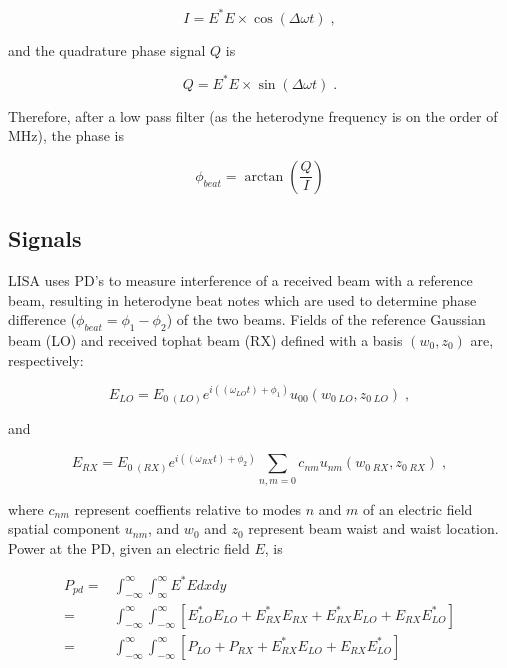 \documentclass[aps,twoside,secnumarabic,balancelastpage,amsmath,amssymb,nofootinbib,hyperref=pdftex]{revtex4}
\begin{document}
\begin{equation}
	I
	=
	E^{*}E \times \cos (\Delta \omega t) \; ,	
\end{equation}

and the quadrature phase signal $Q$ is

\begin{equation}
	Q
	=
	E^{*}E \times \sin (\Delta \omega t) \; .
\end{equation}


Therefore, after a low pass filter (as the heterodyne frequency is on the order of MHz), the phase is 

\begin{equation}
 		\phi_{beat}
 		=
 		 	\arctan	(\frac{Q}{I})	
\end{equation}


\subsection{Signals}

LISA uses PD's to measure interference of a received beam with a reference beam, resulting in heterodyne beat notes which are used to determine phase difference ($\phi_{beat} = \phi_{1}-\phi_{2}$) of the two beams. Fields of the reference Gaussian beam (LO) and received tophat beam (RX) defined with a basis $(w_{0},z_{0})$ are, respectively:

\begin{equation} \label{eq:19}
	E_{LO} = 
		E_{0\; (LO)} e^{i(( \omega_{LO} t)+\phi_{1})}
		u_{00}(w_{0\; LO},z_{0\; LO})	
	\;,
\end{equation}

and

\begin{equation} \label{eq:18}
	E_{RX} = 
		E_{0\; (RX)} e^{i (( \omega_{RX}t)+\phi_{2})} 			
		\sum_{n,m=0}
		c_{nm}u_{nm}(w_{0\; RX},z_{0\; RX}) 		
	\;,
\end{equation}
	
where $c_{nm}$ represent coeffients relative to modes $n$ and $m$ of an electric field spatial component $u_{nm}$, and $w_0$ and $z_0$ represent beam waist and waist location.\\

Power at the PD, given an electric field $E$, is

\begin{align*}
P_{pd} =& \int_{-\infty}^{\infty}\int_{\infty}^{\infty} E^* E dx dy
\\=&	 \int_{- \infty}^{\infty}\int_{- \infty}^{\infty}[
E_{LO}^*E_{LO}+E_{RX}^*E_{RX}+E_{RX}^*E_{LO}+E_{RX}E_{LO}^*]
\\=&	 \int_{- \infty}^{\infty}\int_{- \infty}^{\infty}[
P_{LO} + P_{RX} + E_{RX}^*E_{LO}+E_{RX}E_{LO}^*]
\end{align*}
\end{document}
